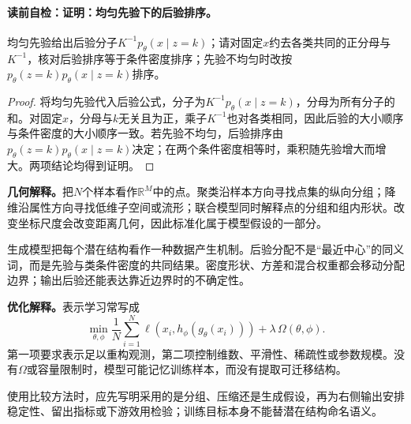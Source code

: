 \label{struct:V4-C01-CH13}
\paragraph{读前自检：证明：均匀先验下的后验排序。}均匀先验给出后验分子$K^{-1}p_\theta(x\mid z=k)$；请对固定$x$约去各类共同的正分母与$K^{-1}$，核对后验排序等于条件密度排序；先验不均匀时改按$p_\theta(z=k)p_\theta(x\mid z=k)$排序。\par

\begin{proof}
将均匀先验代入后验公式，分子为$K^{-1}p_\theta(x\mid z=k)$，分母为所有分子的和。对固定$x$，分母与$k$无关且为正，乘子$K^{-1}$也对各类相同，因此后验的大小顺序与条件密度的大小顺序一致。若先验不均匀，后验排序由$p_\theta(z=k)p_\theta(x\mid z=k)$决定；在两个条件密度相等时，乘积随先验增大而增大。两项结论均得到证明。
\end{proof}

\label{struct:V4-C01-CH14}
\begin{geometrybox}
\textbf{几何解释。}把$N$个样本看作$\mathbb R^M$中的点。聚类沿样本方向寻找点集的纵向分组；降维沿属性方向寻找低维子空间或流形；联合模型同时解释点的分组和组内形状。改变坐标尺度会改变距离几何，因此标准化属于模型假设的一部分。
\end{geometrybox}

\label{struct:V4-C01-CH15}
\begin{probabilitybox}
生成模型把每个潜在结构看作一种数据产生机制。后验分配不是“最近中心”的同义词，而是先验与类条件密度的共同结果。密度形状、方差和混合权重都会移动分配边界；输出后验还能表达靠近边界时的不确定性。
\end{probabilitybox}

\label{struct:V4-C01-CH16}
\begin{optimizationbox}
\textbf{优化解释。}表示学习常写成
\[
\min_{\theta,\phi}\frac1N\sum_{i=1}^{N}
\ell\!\left(x_i,h_\phi(g_\theta(x_i))\right)
+\lambda\,\Omega(\theta,\phi).
\]
第一项要求表示足以重构观测，第二项控制维数、平滑性、稀疏性或参数规模。没有$\Omega$或容量限制时，模型可能记忆训练样本，而没有提取可迁移结构。
\end{optimizationbox}

\label{struct:V4-C01-CH17}

使用比较方法时，应先写明采用的是分组、压缩还是生成假设，再为右侧输出安排稳定性、留出指标或下游效用检验；训练目标本身不能替潜在结构命名语义。

